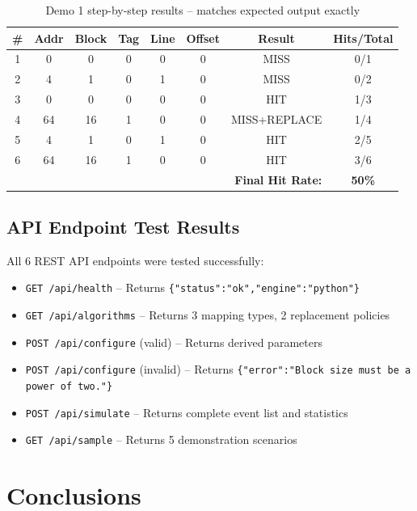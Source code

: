 \documentclass[12pt,a4paper]{report}
\begin{document}
\begin{table}[H]
\centering
\begin{tabular}{cccccccc}
\toprule
\textbf{\#} & \textbf{Addr} & \textbf{Block} & \textbf{Tag} & \textbf{Line} & \textbf{Offset} & \textbf{Result} & \textbf{Hits/Total} \\
\midrule
1 & 0  & 0  & 0 & 0 & 0 & \textcolor{missred}{MISS}         & 0/1 \\
2 & 4  & 1  & 0 & 1 & 0 & \textcolor{missred}{MISS}         & 0/2 \\
3 & 0  & 0  & 0 & 0 & 0 & \textcolor{hitgreen}{HIT}         & 1/3 \\
4 & 64 & 16 & 1 & 0 & 0 & \textcolor{warnorg}{MISS+REPLACE} & 1/4 \\
5 & 4  & 1  & 0 & 1 & 0 & \textcolor{hitgreen}{HIT}         & 2/5 \\
6 & 64 & 16 & 1 & 0 & 0 & \textcolor{hitgreen}{HIT}         & 3/6 \\
\midrule
\multicolumn{7}{r}{\textbf{Final Hit Rate:}} & \textbf{50\%} \\
\bottomrule
\end{tabular}
\caption{Demo 1 step-by-step results -- matches expected output exactly}
\end{table}

\section{API Endpoint Test Results}
All 6 REST API endpoints were tested successfully:
\begin{itemize}
  \item \texttt{GET /api/health} -- Returns \texttt{\{"status":"ok","engine":"python"\}}
  \item \texttt{GET /api/algorithms} -- Returns 3 mapping types, 2 replacement policies
  \item \texttt{POST /api/configure} (valid) -- Returns derived parameters
  \item \texttt{POST /api/configure} (invalid) -- Returns \texttt{\{"error":"Block size must be a power of two."\}}
  \item \texttt{POST /api/simulate} -- Returns complete event list and statistics
  \item \texttt{GET /api/sample} -- Returns 5 demonstration scenarios
\end{itemize}

\chapter{Conclusions}
\end{document}
